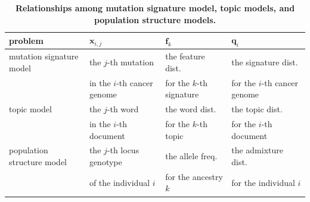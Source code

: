 \clearpage

\begin{table}[!ht]
\caption{
{\bf Relationships among mutation signature model, topic models, and population structure models.}
}
\begin{center}
\begin{tabular}{|l|l|l|l|} \hline
problem & $\bm{x}_{i,j}$ & $\bm{f}_{k}$ & $\bm{q}_{i}$  \\ \hline
mutation signature model & the $j$-th mutation  & the feature dist.  & the signature dist.  \\
& in the $i$-th cancer genome & for the $k$-th signature & for the $i$-th cancer genome \\ \hline
topic model &  the $j$-th word & the word dist. & the topic dist. \\ 
& in the $i$-th document & for the $k$-th topic & for the $i$-th document \\ \hline
population structure model & the $j$-th locus genotype & the allele freq.  & the admixture dist. \\
& of the individual $i$  & for the ancestry $k$ & for the individual $i$ \\
\hline 
\end{tabular}
\end{center}
\label{tab_pop}
\end{table}


\clearpage


